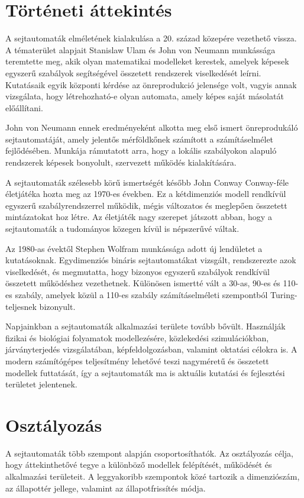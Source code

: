 \documentclass{thesis-ekf}
\begin{document}
\section{Történeti áttekintés}
A sejtautomaták elméletének kialakulása a 20. század közepére vezethető vissza. A tématerület alapjait Stanislaw Ulam és John von Neumann munkássága teremtette meg, akik olyan matematikai modelleket kerestek, amelyek képesek egyszerű szabályok segítségével összetett rendszerek viselkedését leírni. Kutatásaik egyik központi kérdése az önreprodukció jelensége volt, vagyis annak vizsgálata, hogy létrehozható-e olyan automata, amely képes saját másolatát előállítani.

John von Neumann ennek eredményeként alkotta meg első ismert önreprodukáló sejtautomatáját, amely jelentős mérföldkőnek számított a számításelmélet fejlődésében. Munkája rámutatott arra, hogy a lokális szabályokon alapuló rendszerek képesek bonyolult, szervezett működés kialakítására.

A sejtautomaták szélesebb körű ismertségét később John Conway Conway-féle életjátéka hozta meg az 1970-es években. Ez a kétdimenziós modell rendkívül egyszerű szabályrendszerrel működik, mégis változatos és meglepően összetett mintázatokat hoz létre. Az életjáték nagy szerepet játszott abban, hogy a sejtautomaták a tudományos közegen kívül is népszerűvé váltak.

Az 1980-as évektől Stephen Wolfram munkássága adott új lendületet a kutatásoknak. Egydimenziós bináris sejtautomatákat vizsgált, rendszerezte azok viselkedését, és megmutatta, hogy bizonyos egyszerű szabályok rendkívül összetett működéshez vezethetnek. Különösen ismertté vált a 30-as, 90-es és 110-es szabály, amelyek közül a 110-es szabály számításelméleti szempontból Turing-teljesnek bizonyult.

Napjainkban a sejtautomaták alkalmazási területe tovább bővült. Használják fizikai és biológiai folyamatok modellezésére, közlekedési szimulációkban, járványterjedés vizsgálatában, képfeldolgozásban, valamint oktatási célokra is. A modern számítógépes teljesítmény lehetővé teszi nagyméretű és összetett modellek futtatását, így a sejtautomaták ma is aktuális kutatási és fejlesztési területet jelentenek.

\section{Osztályozás}
A sejtautomaták több szempont alapján csoportosíthatók. Az osztályozás célja, hogy áttekinthetővé tegye a különböző modellek felépítését, működését és alkalmazási területeit. A leggyakoribb szempontok közé tartozik a dimenziószám, az állapottér jellege, valamint az állapotfrissítés módja.
\end{document}
